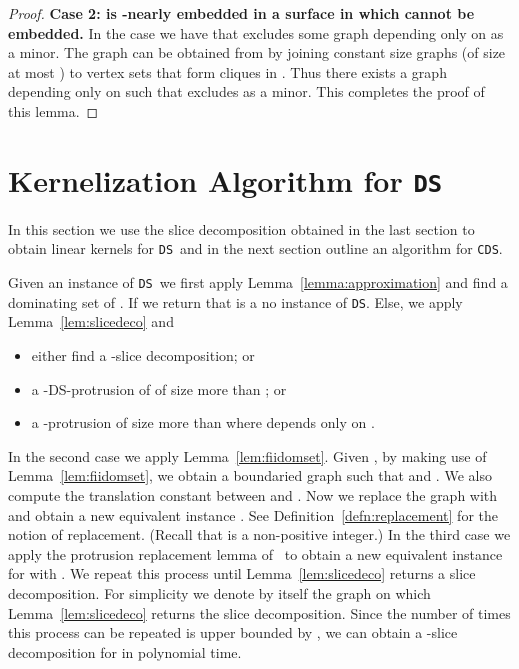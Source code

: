 \documentclass[11pt]{article}
\newcommand{\tDS}{{\texttt{\sc DS}}}
\newcommand{\tCDS}{{\texttt{\sc CDS}}}
\begin{document}
\begin{proof}
\medskip
 \noindent 
 {\bf Case 2:    is -nearly embedded in a surface  in which  cannot be embedded.} 
In the case  we have that  excludes some graph  depending only on  as a minor. The graph  can be obtained from   by joining constant size graphs (of size at most ) to vertex sets that form cliques in . Thus there exists a graph  depending only on  such that  excludes  as a minor. This completes the proof of this lemma. 
\end{proof}








\section{Kernelization Algorithm for \tDS}
\label{sec:domset_kernel}
In this section we use the slice decomposition obtained in the last section 
to obtain linear kernels for  \tDS \ and in the next section outline an algorithm for \tCDS.



Given an instance  of \tDS \,  we first apply Lemma~\ref{lemma:approximation} and find  a dominating set  of . 
If  we return that  is a {\sc no} instance of \tDS. Else, 
we apply Lemma~\ref{lem:slicedeco} and
\begin{itemize}
\item  either find  a -slice decomposition; or 
\item a -{\sc DS}-protrusion  of  
of size more than ; or
\item a -protrusion of size more than  where  depends only on .
\end{itemize}
In the second case we apply Lemma~\ref{lem:fiidomset}. Given , by making use of  Lemma~\ref{lem:fiidomset}, we obtain a boundaried graph  such that  and .  
We also compute the translation constant  between  
and .  Now we replace the graph  with  and obtain a new equivalent instance . See  Definition~\ref{defn:replacement} for the notion of replacement. (Recall that  is a non-positive integer.) In the third case we apply the protrusion replacement lemma of~\cite[Lemma~7]{H.Bodlaender:2009ng} to obtain a new equivalent instance  for  with . We repeat this process until Lemma~\ref{lem:slicedeco}  returns a slice decomposition. 
For simplicity we denote by  itself the graph on which Lemma~\ref{lem:slicedeco} returns the slice decomposition. Since the number of times this process can be repeated is upper bounded by , we can obtain a -slice decomposition for  in polynomial time.   
\end{document}
